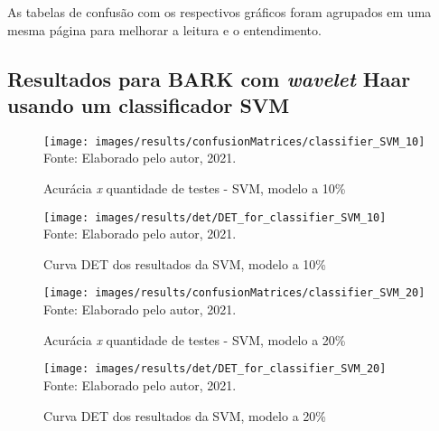 		
		
		\par As tabelas de confusão com os respectivos gráficos foram agrupados em uma mesma página para melhorar a leitura e o entendimento.

		\subsection{Resultados para BARK com \textit{wavelet} Haar usando um classificador SVM}
			
			
			
			
			

			\begin{figure}[H]
				\centering
				\caption{Acurácia \textit{x} quantidade de testes - SVM, modelo a 10\%}
				\texttt{[image: images/results/confusionMatrices/classifier\_SVM\_10]}
				\label{fig:classifiersvm10}
				\\Fonte: Elaborado pelo autor, 2021.
			\end{figure}
		
			\begin{figure}[H]
				\centering
				\caption{Curva DET dos resultados da SVM, modelo a 10\%}
				\texttt{[image: images/results/det/DET\_for\_classifier\_SVM\_10]}
				\label{fig:detsvm10}
				\\Fonte: Elaborado pelo autor, 2021.
			\end{figure}

			\begin{figure}[H]
				\centering
				\caption{Acurácia \textit{x} quantidade de testes - SVM, modelo a 20\%}
				\texttt{[image: images/results/confusionMatrices/classifier\_SVM\_20]}
				\label{fig:classifiersvm20}
				\\Fonte: Elaborado pelo autor, 2021.
			\end{figure}
		
			\begin{figure}[H]
				\centering
				\caption{Curva DET dos resultados da SVM, modelo a 20\%}
				\texttt{[image: images/results/det/DET\_for\_classifier\_SVM\_20]}
				\label{fig:detsvm20}
				\\Fonte: Elaborado pelo autor, 2021.
			\end{figure}

